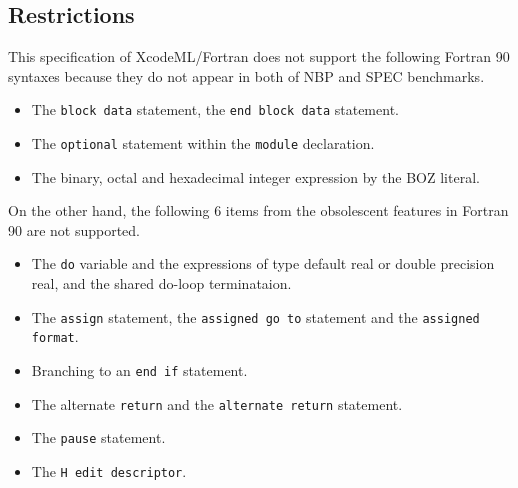 \subsection{Restrictions}

This specification of XcodeML/Fortran does not support the following Fortran 90 syntaxes because they do not appear in both of NBP and SPEC benchmarks.

\begin{itemize}
\item The {\tt block data} statement, the {\tt end block data} statement.
\item The {\tt optional} statement within the {\tt module} declaration.
\item The binary, octal and hexadecimal integer expression by the BOZ literal.
\end{itemize}

On the other hand, the following 6 items from the obsolescent features in Fortran 90 are not supported.

\begin{itemize}
\item The {\tt do} variable and the expressions of type default real or double precision real, and the shared do-loop terminataion.
\item The {\tt assign} statement, the {\tt assigned go to} statement and the {\tt assigned format}.
\item Branching to an {\tt end if} statement.
\item The alternate {\tt return} and the {\tt alternate return} statement.
\item The {\tt pause} statement.
\item The {\tt H edit descriptor}.
\end{itemize}


